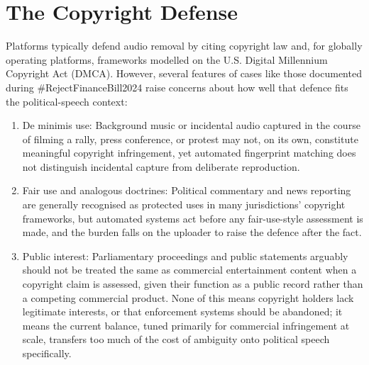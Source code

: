\documentclass{article}
\begin{document}
\section{The Copyright Defense}
Platforms typically defend audio removal by citing copyright law and, for globally operating platforms, frameworks modelled on the U.S. Digital Millennium Copyright Act (DMCA). However, several features of cases like those documented during \#RejectFinanceBill2024 raise concerns about how well that defence fits the political-speech context:
\begin{enumerate}


\item De minimis use: Background music or incidental audio captured in the course of filming a rally, press conference, or protest may not, on its own, constitute meaningful copyright infringement, yet automated fingerprint matching does not distinguish incidental capture from deliberate reproduction.
\item Fair use and analogous doctrines: Political commentary and news reporting are generally recognised as protected uses in many jurisdictions' copyright frameworks, but automated systems act before any fair-use-style assessment is made, and the burden falls on the uploader to raise the defence after the fact.
\item Public interest: Parliamentary proceedings and public statements arguably should not be treated the same as commercial entertainment content when a copyright claim is assessed, given their function as a public record rather than a competing commercial product.
None of this means copyright holders lack legitimate interests, or that enforcement systems should be abandoned; it means the current balance, tuned primarily for commercial infringement at scale, transfers too much of the cost of ambiguity onto political speech specifically.
\end{enumerate}
\par 
\end{document}
